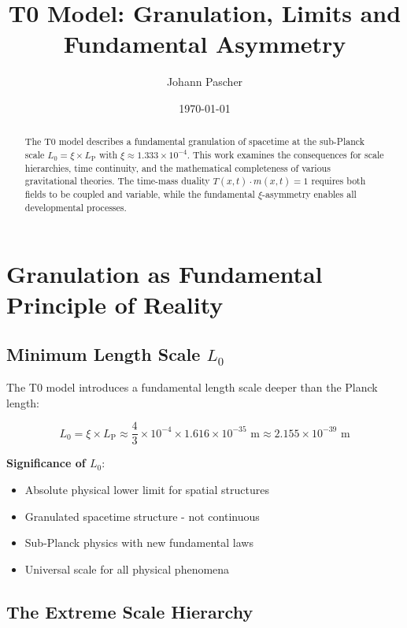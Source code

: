\documentclass[12pt,a4paper]{article}
\title{T0 Model: Granulation, Limits and Fundamental Asymmetry}
\author{Johann Pascher}
\date{\today}
\newcommand{\xipar}{\xi}
\newcommand{\Lzero}{L_0}
\newcommand{\Lp}{L_{\text{P}}}
\theoremstyle{definition}
\theoremstyle{remark}
\begin{document}
	
	\maketitle
	
	\begin{abstract}
		The T0 model describes a fundamental granulation of spacetime at the sub-Planck scale $\Lzero = \xipar \times \Lp$ with $\xipar \approx 1.333 \times 10^{-4}$. This work examines the consequences for scale hierarchies, time continuity, and the mathematical completeness of various gravitational theories. The time-mass duality $T(x,t) \cdot m(x,t) = 1$ requires both fields to be coupled and variable, while the fundamental $\xipar$-asymmetry enables all developmental processes.
	\end{abstract}
	
	\tableofcontents
	\newpage
	
	\section{Granulation as Fundamental Principle of Reality}
	
	\subsection{Minimum Length Scale $\Lzero$}
	
	The T0 model introduces a fundamental length scale deeper than the Planck length:
	
	\begin{equation}
		\Lzero = \xipar \times \Lp \approx \frac{4}{3} \times 10^{-4} \times 1.616 \times 10^{-35} \text{ m} \approx 2.155 \times 10^{-39} \text{ m}
	\end{equation}
	
	\textbf{Significance of $\Lzero$}:
	\begin{itemize}
		\item Absolute physical lower limit for spatial structures
		\item Granulated spacetime structure - not continuous
		\item Sub-Planck physics with new fundamental laws
		\item Universal scale for all physical phenomena
	\end{itemize}
	
	\subsection{The Extreme Scale Hierarchy}
	
\end{document}
